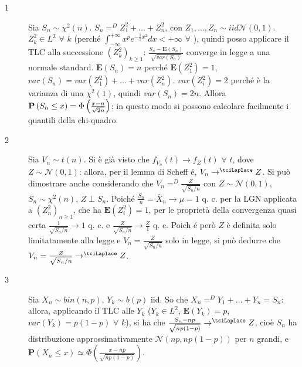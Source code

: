 \documentclass{article}
\begin{document}
\begin{description}
\item[1] Sia $S_{n}\sim \chi ^{2}\left( n\right) $. $%
S_{n}=^{D}Z_{1}^{2}+...+Z_{n}^{2}$, con $Z_{1},...,Z_{n}\sim iid\mathcal{N}%
\left( 0,1\right) $. $Z_{k}^{2}\in L^{2}$ $\forall $ $k$ (perch\'{e} $%
\int_{-\infty }^{+\infty }x^{p}e^{-\frac{1}{2}x^{2}}dx<+\infty $ $\forall $
), quindi posso applicare il TLC alla successione $\left( Z_{k}^{2}\right)
_{k\geq 1}$: $\frac{S_{n}-\mathbf{E}\left( S_{n}\right) }{\sqrt{var\left(
S_{n}\right) }}$ converge in legge a una normale standard. $\mathbf{E}\left(
S_{n}\right) =n$ perch\'{e} $\mathbf{E}\left( Z_{1}^{2}\right) =1$, $%
var\left( S_{n}\right) =var\left( Z_{1}^{2}\right) +...+var\left(
Z_{n}^{2}\right) $. $var\left( Z_{i}^{2}\right) =2$ perch\'{e} \`{e} la
varianza di una $\chi ^{2}\left( 1\right) $, quindi $var\left( S_{n}\right)
=2n$. Allora $\mathbf{P}\left( S_{n}\leq x\right) =\Phi \left( \frac{x-n}{%
\sqrt{2n}}\right) $: in questo modo si possono calcolare facilmente i
quantili della chi-quadro.

\item[2] Sia $V_{n}\sim t\left( n\right) $. Si \`{e} gi\`{a} visto che $%
f_{V_{n}}\left( t\right) \rightarrow f_{Z}\left( t\right) $ $\forall $ $t$,
dove $Z\sim \mathcal{N}\left( 0,1\right) $: allora, per il lemma di Scheff%
\'{e}, $V_{n}\rightarrow ^{\tciLaplace }Z$. Si pu\`{o} dimostrare anche
considerando che $V_{n}=^{D}\frac{Z}{\sqrt{S_{n}/n}}$ con $Z\sim \mathcal{N}%
\left( 0,1\right) $, $S_{n}\sim \mathcal{\chi }^{2}\left( n\right) $, $%
Z\perp S_{n}$. Poich\'{e} $\frac{S_{n}}{n}=\bar{X}_{n}\rightarrow \mu =1$ q.
c. per la LGN applicata a $\left( Z_{n}^{2}\right) _{n\geq 1}$, che ha $%
\mathbf{E}\left( Z_{i}^{2}\right) =1$, per le propriet\`{a} della
convergenza quasi certa $\frac{1}{\sqrt{S_{n}/n}}\rightarrow 1$ q. c. e $%
\frac{Z}{\sqrt{S_{n}/n}}\rightarrow \frac{Z}{1}$ q. c. Poich%
\'{e} per\`{o} $Z$ \`{e} definita solo limitatamente alla legge e $V_{n}=%
\frac{Z}{\sqrt{S_{n}/n}}$ solo in legge, si pu\`{o} dedurre che $V_{n}=\frac{%
Z}{\sqrt{S_{n}/n}}\rightarrow ^{\tciLaplace }Z$.

\item[3] Sia $X_{n}\sim bin\left( n,p\right) $, $Y_{k}\sim b\left( p\right) $
iid. So che $X_{n}=^{D}Y_{1}+...+Y_{n}=S_{n}$: allora, applicando il TLC
alle $Y_{k}$ ($Y_{k}\in L^{2}$, $\mathbf{E}\left( Y_{k}\right) =p$, $%
var\left( Y_{k}\right) =p\left( 1-p\right) $ $\forall $ $k$), si ha che $%
\frac{S_{n}-np}{\sqrt{np\left( 1-p\right) }}\rightarrow ^{\tciLaplace }Z$,
cio\`{e} $S_{n}$ ha distribuzione approssimativamente $\mathcal{N}\left(
np,np\left( 1-p\right) \right) $ per $n$ grandi, e $\mathbf{P}\left(
X_{n}\leq x\right) \simeq \Phi \left( \frac{x-np}{\sqrt{np\left( 1-p\right) }%
}\right) $.
\end{description}
\end{document}
